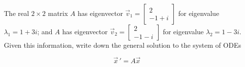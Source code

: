 \documentclass[addpoints,12pt]{exam}
\newcommand{\vv}[2]{\begin{bmatrix} #1 \\ #2 \end{bmatrix}}
\begin{document}
\begin{questions}
 
 \newpage
 
 \question[3] The real $2\times2$ matrix $A$  has eigenvector $\vec v_1=\vv{2}{-1+i}$ for eigenvalue $\lambda_1=1+3i$; and $A$ has eigenvector  $\vec v_2=\vv{2}{-1-i}$ for eigenvalue $\lambda_2=1-3i$. Given this information, write down the general solution to the system of ODEs
 
 $$\vec x\,'=A\vec x$$
 
 
 
 
 
\end{questions}
\newpage
\end{document}
